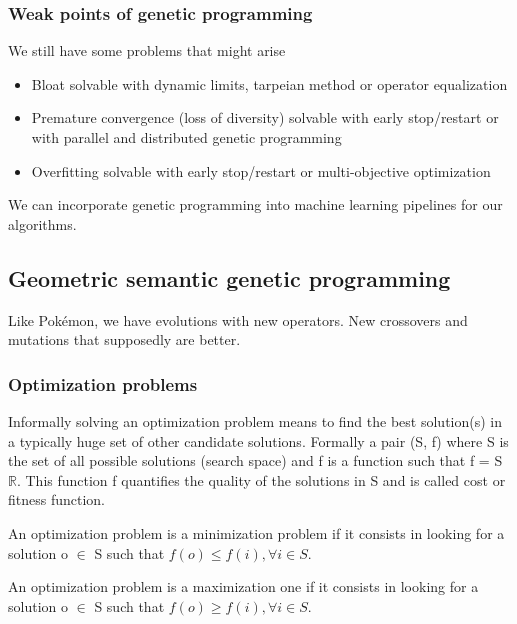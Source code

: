 \subsubsection{Weak points of genetic programming}

We still have some problems that might arise

\begin{itemize}
    \item Bloat \ra solvable with dynamic limits, tarpeian method or operator equalization
    \item Premature convergence (loss of diversity) \ra solvable with early stop/restart or with parallel and distributed genetic programming
    \item Overfitting \ra solvable with early stop/restart or multi-objective optimization
\end{itemize}

We can incorporate genetic programming into machine learning pipelines for our algorithms. 

\subsection{Geometric semantic genetic programming}

Like Pokémon, we have evolutions with new operators. New crossovers and mutations that supposedly are better. 



\subsubsection{Optimization problems}

Informally solving an optimization problem means to find the best solution(s) in a typically huge set of other candidate solutions. Formally a pair (S, f) where S is the set of all possible solutions (search space) and f is a function such that f = S \ra $\mathbb{R}$. This function f quantifies the quality of the solutions in S and is called cost or fitness function. 

\vspace{10pt}

An optimization problem is a minimization problem if it consists in looking for a solution o $\in$ S such that $f(o) \leq f(i), \forall i \in S$.

An optimization problem is a maximization one if it consists in looking for a solution o $\in$ S such that $f(o) \geq f(i), \forall i \in S$.

